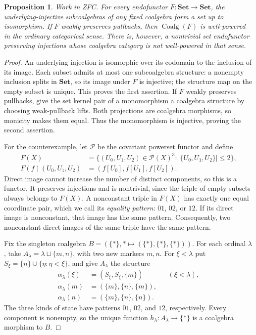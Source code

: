 \documentclass[11pt]{article}
\newtheorem{proposition}[theorem]{Proposition}
\begin{document}
\begin{proposition}\label{prop:coalgebra-wellpoweredness}
Work in ZFC. For every endofunctor $F:\mathbf{Set}\to\mathbf{Set}$,
the underlying-injective subcoalgebras of any fixed coalgebra form a set
up to isomorphism. If $F$ weakly preserves pullbacks, then
$\operatorname{Coalg}(F)$ is well-powered in the ordinary categorical
sense. There is, however, a nontrivial set endofunctor preserving
injections whose coalgebra category is not well-powered in that sense.
\end{proposition}
\begin{proof}
An underlying injection is isomorphic over its codomain to the inclusion
of its image. Each subset admits at most one subcoalgebra structure:
a nonempty inclusion splits in $\mathbf{Set}$, so its image under $F$
is injective; the structure map on the empty subset is unique. This
proves the first assertion. If $F$ weakly preserves pullbacks, give the
set kernel pair of a monomorphism a coalgebra structure by choosing
weak-pullback lifts. Both projections are coalgebra morphisms, so
monicity makes them equal. Thus the monomorphism is injective, proving
the second assertion.

For the counterexample, let $\mathcal P$ be the covariant powerset
functor and define
\begin{align*}
F(X)&=\{(U_0,U_1,U_2)\in\mathcal P(X)^3:
 |\{U_0,U_1,U_2\}|\leq2\},\\
F(f)(U_0,U_1,U_2)&=(f[U_0],f[U_1],f[U_2]).
\end{align*}
Direct image cannot increase the number of distinct components, so this
is a functor. It preserves injections and is nontrivial, since the
triple of empty subsets always belongs to $F(X)$.
A nonconstant triple in $F(X)$ has exactly one equal coordinate pair,
which we call its \emph{equality pattern}: $01$, $02$, or $12$.
If its direct image is nonconstant, that image has the same pattern.
Consequently, two nonconstant direct images of the same triple have
the same pattern.

Fix the singleton coalgebra
$B=(\{*\},*\mapsto(\{*\},\{*\},\{*\}))$.
For each ordinal $\lambda$, take
$A_\lambda=\lambda\sqcup\{m,n\}$, with two new markers $m,n$.
For $\xi<\lambda$ put $S_\xi=\{n\}\cup\{\eta:\eta<\xi\}$,
and give $A_\lambda$ the structure
\[
\begin{aligned}
\alpha_\lambda(\xi)&=(S_\xi,S_\xi,\{m\}) &&(\xi<\lambda),\\
\alpha_\lambda(m)&=(\{m\},\{n\},\{m\}),\\
\alpha_\lambda(n)&=(\{m\},\{n\},\{n\}).
\end{aligned}
\]
The three kinds of state have patterns $01$, $02$, and $12$,
respectively. Every component is nonempty, so the unique function
$h_\lambda:A_\lambda\to\{*\}$ is a coalgebra morphism to $B$.


\end{proof}
\end{document}
